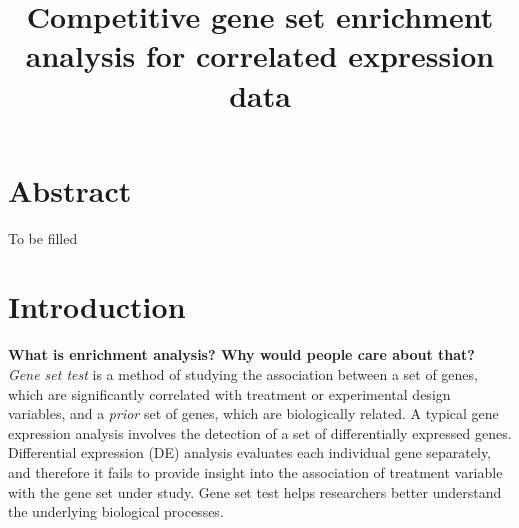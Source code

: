 \documentclass[11pt, a4paper]{article}
\title{Competitive gene set enrichment analysis for correlated expression data}
\date{} %
\begin{document}
	\newpage
	\maketitle
	
	\section*{Abstract}
	To be filled
	
	\section{Introduction}\label{section:introduction}
	
	\textbf{What is enrichment analysis? Why would people care about that?}\\
	 \textit{Gene set test} is a method of studying the association between a set of genes, which are significantly correlated with treatment or experimental design variables, and a \textit{prior} set of genes, which are biologically related. A typical gene expression analysis involves the detection of a set of differentially expressed genes. Differential expression (DE) analysis  evaluates each individual gene separately, and therefore it fails to provide insight into the association of treatment variable with the gene set under study. Gene set test helps researchers better understand the underlying biological processes.
	 
\end{document}
